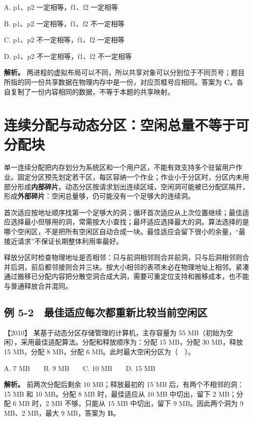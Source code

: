A. p1、p2 一定相等，f1、f2 一定相等

B. p1、p2 一定相等，f1、f2 不一定相等

C. p1、p2 不一定相等，f1、f2 一定相等

D. p1、p2 不一定相等，f1、f2 不一定相等


\textbf{解析。} 两进程的虚拟布局可以不同，所以共享对象可以分别位于不同页号；题目所指的同一份共享数据在物理内存中是一份，对应页框号应相同。答案为 \textbf{C}。各自复制了一份内容相同的数据，不等于本题的共享映射。

\section{连续分配与动态分区：空闲总量不等于可分配块}\label{os-5-3}

单一连续分配把内存划分为系统区和一个用户区，不能有效支持多个驻留用户作业。固定分区预先划定若干区，每区容纳一个作业；作业小于分区时，分区内未用部分形成\textbf{内部碎片}。动态分区按请求划出连续区域，空闲洞可能被已分配区隔开，形成\textbf{外部碎片}：空闲总量够，仍可能没有一个足够大的连续洞。

首次适应按地址顺序找第一个足够大的洞；循环首次适应从上次位置继续；最佳适应选择最小但够用的洞，常需按大小查找；最坏适应选择最大的洞。算法选择的是哪个空闲区，不是把所有空闲区自动合成一块。最佳适应会留下很小的余量，``最接近请求''不保证长期整体利用率最好。

释放分区时检查物理地址是否相邻：只与前洞相邻则合并前洞，只与后洞相邻则合并后洞，前后都邻接则合并三块。按大小相邻的表项未必在物理地址上相邻。紧凑通过搬移已分配内容把分散空洞合成大洞，需要可重定位支持和搬移成本，也不能与普通释放合并混同。

\subsection{例 5-2　最佳适应每次都重新比较当前空闲区}\label{os-ex5-2}

\noindent{}【2010】 某基于动态分区存储管理的计算机，主存容量为 55 MB（初始为空闲），采用最佳适配算法。分配和释放顺序为：分配 15 MB，分配 30 MB，释放 15 MB，分配 8 MB，分配 6 MB。此时最大空闲分区为（　）。

A. 7 MB　　B. 9 MB　　C. 10 MB　　D. 15 MB


\textbf{解析。} 前两次分配后剩余 10 MB；释放最初的 15 MB 后，有两个不相邻的洞：15 MB 和 10 MB。分配 8 MB 时，最佳适应从 10 MB 中切出，留下 2 MB；分配 6 MB 时，2 MB 不够，只能从 15 MB 中切出，留下 9 MB。因此两个洞为 9 MB、2 MB，最大 9 MB，答案为 \textbf{B}。

